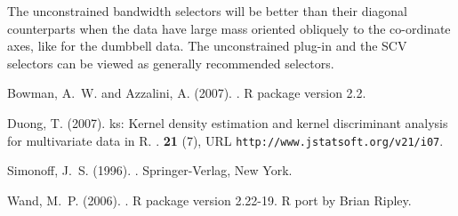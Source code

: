 \documentclass[a4paper,11pt]{article}
\let\pkg=\texttt
\begin{document}
The unconstrained bandwidth selectors will be better than their diagonal counterparts
when the data have large mass oriented obliquely to the co-ordinate axes,
like for the dumbbell data. 
The unconstrained plug-in and the SCV selectors
can be viewed as generally recommended selectors.





\begin{thebibliography}{}


Bowman, A.~W. and Azzalini, A. (2007).
.
\newblock R package version 2.2.

Duong, T. (2007).
\newblock ks: {K}ernel density estimation and kernel discriminant analysis for
  multivariate data in {R}.
. \textbf{21} (7), URL \texttt{http://www.jstatsoft.org/v21/i07}.


Simonoff, J.~S. (1996).
.
\newblock Springer-Verlag, New York.


Wand, M.~P. (2006).
.
\newblock R package version 2.22-19. R port by Brian Ripley.

\end{thebibliography}
\end{document}
